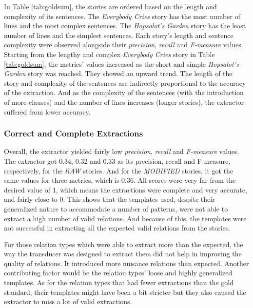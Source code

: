 In Table \ref{tab:goldsum}, the stories are ordered based on the length and complexity of its sentences. The \textit{Everybody Cries} story has the most number of lines and the most complex sentences. The \textit{Hopsalot's Garden} story has the least number of lines and the simplest sentences. Each story's length and sentence complexity were observed alongside their \textit{precision}, \textit{recall} and \textit{F-measure} values. Starting from the lengthy and complex \textit{Everybody Cries} story in Table \ref{tab:goldsum}, the metrics' values increased as the short and simple \textit{Hopsalot's Garden} story was reached. They showed an upward trend. The length of the story and complexity of the sentences are indirectly proportional to the accuracy of the extraction. And as the complexity of the sentences (with the introduction of more clauses) and the number of lines increases (longer stories), the extractor suffered from lower accuracy.

\subsubsection*{Correct and Complete Extractions}

Overall, the extractor yielded fairly low \textit{precision}, \textit{recall} and \textit{F-measure} values. The extractor got 0.34, 0.32 and 0.33 as its precision, recall and F-measure, respectively, for the \textit{RAW} stories. And for the \textit{MODIFIED}  stories, it got the same values for three metrics, which is 0.36. All scores were very far from the desired value of 1, which means the extractions were complete and very accurate, and fairly close to 0. This shows that the templates used, despite their generalized nature to accommodate a number of patterns, were not able to extract a high number of valid relations. And because of this, the templates were not successful in extracting all the expected valid relations from the stories. 

For those relation types which were able to extract more than the expected, the way the transducer was designed to extract them did not help in improving the quality of relations. It introduced more nuisance relations than expected. Another contributing factor would be the relation types' loose and highly generalized templates. As for the relation types that had fewer extractions than the gold standard, their templates might have been a bit stricter but they also caused the extractor to miss a lot of valid extractions. 

